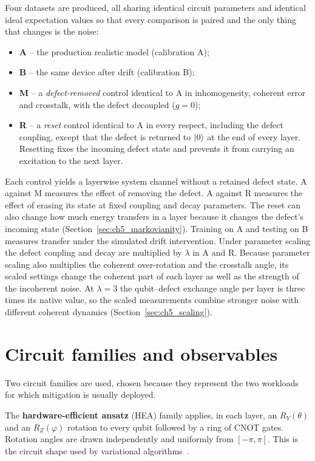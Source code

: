 \documentclass[Thesis.tex]{subfiles}
\begin{document}
Four datasets are produced, all sharing identical circuit parameters and identical
ideal expectation values so that every comparison is paired and the only thing that
changes is the noise:
\begin{itemize}
    \item \textbf{A} -- the production realistic model (calibration A);
    \item \textbf{B} -- the same device after drift (calibration B);
    \item \textbf{M} -- a \emph{defect-removed} control identical to A in
    inhomogeneity, coherent error and crosstalk, with the defect decoupled
    ($g = 0$);
    \item \textbf{R} -- a \emph{reset} control identical to A in every respect,
    including the defect coupling, except that the defect is returned to $\ket{0}$
    at the end of every layer. Resetting fixes the incoming defect state and
    prevents it from carrying an excitation to the next layer.
\end{itemize}
Each control yields a layerwise system channel without a retained defect state.
A against M measures the effect of removing the defect. A against R measures the
effect of erasing its state at fixed coupling and decay parameters. The reset can
also change how much energy transfers in a layer because it changes the defect's
incoming state (Section~\ref{sec:ch5_markovianity}). Training on A and testing on
B measures transfer under the simulated drift intervention. Under parameter
scaling the defect coupling and decay are multiplied by $\lambda$ in A and R.
Because parameter scaling also multiplies the coherent over-rotation and the
crosstalk angle, its scaled settings change the coherent part of each layer as
well as the strength of the incoherent noise. At $\lambda=3$ the qubit--defect
exchange angle per layer is three times its native value, so the scaled
measurements combine stronger noise with different coherent dynamics
(Section~\ref{sec:ch5_scaling}).

\section{Circuit families and observables}\label{sec:ch3_circuits}

Two circuit families are used, chosen because they represent the two workloads for
which mitigation is usually deployed.

The \textbf{hardware-efficient ansatz} (HEA) family applies, in each layer, an
$R_Y(\theta)$ and an $R_Z(\varphi)$ rotation to every qubit followed by a ring of
CNOT gates. Rotation angles are drawn independently and uniformly from
$[-\pi, \pi]$. This is the circuit shape used by variational algorithms~\cite{kandala2017hardware,cerezo2021vqa}.
\end{document}
